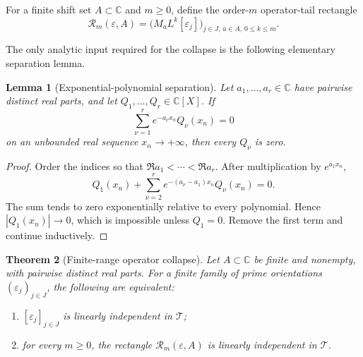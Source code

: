 \documentclass[11pt]{article}
\newtheorem{theorem}{Theorem}[section]
\newtheorem{lemma}[theorem]{Lemma}
\theoremstyle{definition}
\theoremstyle{remark}
\newcommand{\C}{\mathbb C}
\newcommand{\cT}{\mathcal T}
\begin{document}
For a finite shift set \(A\subset\C\) and \(m\geq0\), define the order-\(m\)
operator-tail rectangle
\begin{equation}\label{eq:operator-rectangle}
  \mathscr R_m(\varepsilon,A)
  =\bigl(M_aL^k[\varepsilon_j]\bigr)_{
       j\in J,\,a\in A,\,0\leq k\leq m}.
\end{equation}

The only analytic input required for the collapse is the following elementary separation lemma.

\begin{lemma}[Exponential-polynomial separation]\label{lem:exp-poly}
Let \(a_1,\ldots,a_r\in\C\) have pairwise distinct real parts, and let
\(Q_1,\ldots,Q_r\in\C[X]\).  If
\[
  \sum_{\nu=1}^r e^{-a_\nu x_n}Q_\nu(x_n)=0
\]
on an unbounded real sequence \(x_n\to+\infty\), then every \(Q_\nu\) is zero.
\end{lemma}

\begin{proof}
Order the indices so that
\(\Re a_1<\cdots<\Re a_r\).  After multiplication by \(e^{a_1x_n}\),
\[
  Q_1(x_n)+\sum_{\nu=2}^r e^{-(a_\nu-a_1)x_n}Q_\nu(x_n)=0.
\]
The sum tends to zero exponentially relative to every polynomial.  Hence
\(|Q_1(x_n)|\to0\), which is impossible unless \(Q_1=0\).  Remove the first term and
continue inductively.
\end{proof}

\begin{theorem}[Finite-range operator collapse]\label{thm:operator-collapse}
Let \(A\subset\C\) be finite and nonempty, with pairwise distinct real parts.  For a finite
family of prime orientations \((\varepsilon_j)_{j\in J}\), the following are equivalent:
\begin{enumerate}[label=\textup{(\roman*)},leftmargin=2.2em]
  \item \([\varepsilon_j]_{j\in J}\) is linearly independent in \(\cT\);
  \item for every \(m\geq0\), the rectangle
  \(\mathscr R_m(\varepsilon,A)\) is linearly independent in \(\cT\).
\end{enumerate}
\end{theorem}
\end{document}
